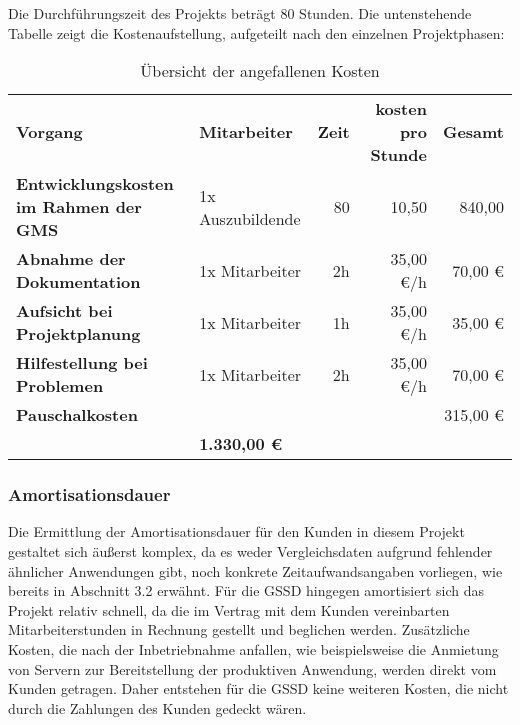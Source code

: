 \begin{flushleft}
		Die Durchführungszeit des Projekts beträgt 80 Stunden. Die untenstehende Tabelle zeigt die Kostenaufstellung, aufgeteilt nach den einzelnen Projektphasen:
			\begin{table}[h]
				\centering
				\begin{tabular}{ >{\bfseries}l l r r r }
					\rowcolor[HTML]{127017}
				\textbf{\color{white}Vorgang} & \textbf{\color{white}Mitarbeiter} & \textbf{\color{white}Zeit} & \textbf{\color{white}kosten pro Stunde} & \textbf{\color{white}Gesamt} \\
				Entwicklungskosten im Rahmen der \acs{GMS} & 1x Auszubildende & 80 & 10,50 & 840,00 \\
				\rowcolor[HTML]{e1efd9}
				Abnahme der Dokumentation & 1x Mitarbeiter & 2h & 35,00 €/h & 70,00 € \\
				Aufsicht bei Projektplanung & 1x Mitarbeiter & 1h & 35,00 €/h & 35,00 € \\
				\rowcolor[HTML]{e1efd9}
				Hilfestellung bei Problemen & 1x Mitarbeiter & 2h & 35,00 €/h & 70,00 € \\
				Pauschalkosten &  &  &  & 315,00 € \\
				\hline
				\rowcolor[HTML]{127017}
				\multicolumn{4}{r}{\textbf{\color{white}Gesamt}} & \textbf{\color{white}1.330,00 €} \\
				\end{tabular}
				\caption{Übersicht der angefallenen Kosten}
				\label{tab:kostenuebersicht}
			\end{table}




		\subsubsection{Amortisationsdauer}
			Die Ermittlung der Amortisationsdauer für den Kunden in diesem Projekt gestaltet sich äußerst komplex, da es weder Vergleichsdaten aufgrund fehlender ähnlicher Anwendungen gibt, noch konkrete Zeitaufwandsangaben vorliegen, wie bereits in Abschnitt 3.2 erwähnt.
			Für die \acs{GSSD} hingegen amortisiert sich das Projekt relativ schnell, da die im Vertrag mit dem Kunden vereinbarten Mitarbeiterstunden in Rechnung gestellt und beglichen werden. Zusätzliche Kosten, die nach der Inbetriebnahme anfallen, wie beispielsweise die Anmietung von Servern zur Bereitstellung der produktiven Anwendung, werden direkt vom Kunden getragen. Daher entstehen für die \acs{GSSD} keine weiteren Kosten, die nicht durch die Zahlungen des Kunden gedeckt wären.


\end{flushleft}
